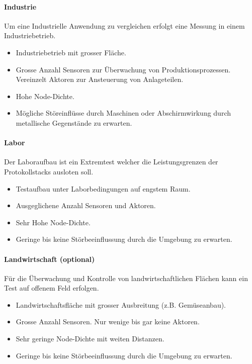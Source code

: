 \paragraph{Industrie}
Um eine Industrielle Anwendung zu vergleichen erfolgt eine Messung in einem Industriebetrieb.
	\begin{itemize}
		\item Industriebetrieb mit grosser Fläche.
		\item Grosse Anzahl Sensoren zur Überwachung von Produktionsprozessen. 				Vereinzelt Aktoren zur Ansteuerung von Anlageteilen.
		\item Hohe Node-Dichte.
		\item Mögliche Störeinflüsse durch Maschinen oder Abschirmwirkung durch 			metallische Gegenstände zu erwarten.
	\end{itemize}

\paragraph{Labor}
Der Laboraufbau ist ein Extremtest welcher die Leistungsgrenzen der Protokollstacks ausloten soll.
	\begin{itemize}
		\item Testaufbau unter Laborbedingungen auf engstem Raum.
		\item Ausgeglichene Anzahl Sensoren und Aktoren.
		\item Sehr Hohe Node-Dichte.
		\item Geringe bis keine Störbeeinflussung durch die Umgebung zu erwarten.
	\end{itemize}
	
\paragraph{Landwirtschaft (optional)}
Für die Überwachung und Kontrolle von landwirtschaftlichen Flächen kann ein Test auf offenem Feld erfolgen.
	\begin{itemize}
		\item Landwirtschaftsfläche mit grosser Ausbreitung (z.B. Gemüseanbau).
		\item Grosse Anzahl Sensoren. Nur wenige bis gar keine Aktoren.
		\item Sehr geringe Node-Dichte mit weiten Distanzen.
		\item Geringe bis keine Störbeeinflussung durch die Umgebung zu erwarten.
	\end{itemize}


